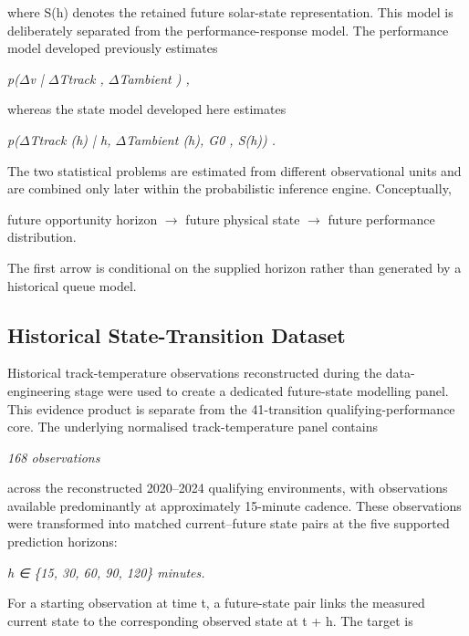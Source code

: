 where S(h) denotes the retained future solar-state representation. This model is deliberately separated from the performance-response model. The performance model developed previously estimates

\begin{center}\textit{p(\ensuremath{\Delta}v | \ensuremath{\Delta}Ttrack , \ensuremath{\Delta}Tambient ) ,}\end{center}

whereas the state model developed here estimates

\begin{center}\textit{p(\ensuremath{\Delta}Ttrack (h) | h, \ensuremath{\Delta}Tambient (h), G0 , S(h)) .}\end{center}

The two statistical problems are estimated from different observational units and are combined only later within the probabilistic inference engine. Conceptually,

future opportunity horizon \ensuremath{\rightarrow} future physical state \ensuremath{\rightarrow} future performance distribution.

The first arrow is conditional on the supplied horizon rather than generated by a historical queue model.

\subsection{Historical State-Transition Dataset}
Historical track-temperature observations reconstructed during the data-engineering stage were used to create a dedicated future-state modelling panel. This evidence product is separate from the 41-transition qualifying-performance core. The underlying normalised track-temperature panel contains

\begin{center}\textit{168 observations}\end{center}

across the reconstructed 2020--2024 qualifying environments, with observations available predominantly at approximately 15-minute cadence. These observations were transformed into matched current--future state pairs at the five supported prediction horizons:

\begin{center}\textit{h ∈ \{15, 30, 60, 90, 120\} minutes.}\end{center}

For a starting observation at time t, a future-state pair links the measured current state to the corresponding observed state at t + h. The target is

